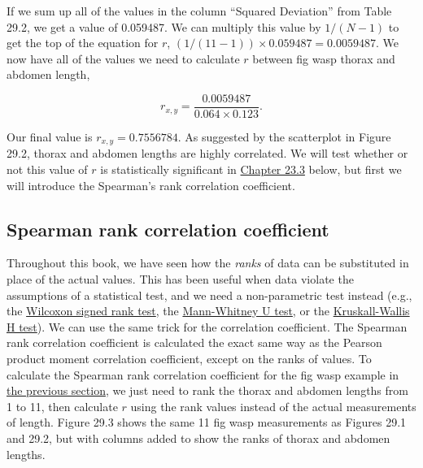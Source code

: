 \documentclass[
]{scrbook}
\begin{document}
If we sum up all of the values in the column ``Squared Deviation'' from Table 29.2, we get a value of 0.059487.
We can multiply this value by \(1 / (N - 1)\) to get the top of the equation for \(r\), \((1 / (11-1)) \times 0.059487 = 0.0059487\).
We now have all of the values we need to calculate \(r\) between fig wasp thorax and abdomen length,

\[r_{x,y} = \frac{0.0059487}{0.064 \times 0.123}.\]

Our final value is \(r_{x, y} = 0.7556784\).
As suggested by the scatterplot in Figure 29.2, thorax and abdomen lengths are highly correlated.
We will test whether or not this value of \(r\) is statistically significant in \protect\hyperlink{correlation-hypothesis-testing}{Chapter 23.3} below, but first we will introduce the Spearman's rank correlation coefficient.

\hypertarget{spearman-rank-correlation-coefficient}{%
\subsection{Spearman rank correlation coefficient}\label{spearman-rank-correlation-coefficient}}

Throughout this book, we have seen how the \emph{ranks} of data can be substituted in place of the actual values.
This has been useful when data violate the assumptions of a statistical test, and we need a non-parametric test instead (e.g., the \protect\hyperlink{wilcoxon-test-1}{Wilcoxon signed rank test}, the \protect\hyperlink{mann-whitney-u-test-1}{Mann-Whitney U test}, or the \protect\hyperlink{Chapter_25}{Kruskall-Wallis H test}).
We can use the same trick for the correlation coefficient.
The Spearman rank correlation coefficient is calculated the exact same way as the Pearson product moment correlation coefficient, except on the ranks of values.
To calculate the Spearman rank correlation coefficient for the fig wasp example in \protect\hyperlink{pearson-product-moment-correlation-coefficient}{the previous section}, we just need to rank the thorax and abdomen lengths from 1 to 11, then calculate \(r\) using the rank values instead of the actual measurements of length.
Figure 29.3 shows the same 11 fig wasp measurements as Figures 29.1 and 29.2, but with columns added to show the ranks of thorax and abdomen lengths.
\end{document}
